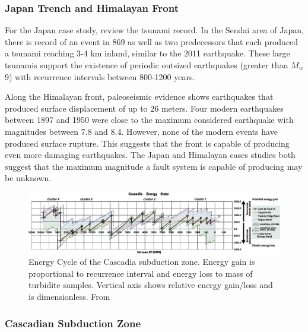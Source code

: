 \documentclass[]{proposalnsf}
\begin{document}
\subsubsection{Japan Trench and Himalayan Front}

For the Japan case study, \citet{Goldfinger2013} review the tsunami record. In the Sendai area of Japan, there is record of an event in 869 as well as two predecessors that each produced a tsunami reaching 3-4 km inland, similar to the 2011 earthquake. These large tsunamis support the existence of periodic outsized earthquakes (greater than $M_w$ 9) with recurrence intervals between 800-1200 years. 

Along the Himalayan front, paleoseismic evidence shows earthquakes that produced surface displacement of up to 26 meters.  Four modern earthquakes between 1897 and 1950 were close to the maximum considered earthquake with magnitudes between 7.8 and 8.4. However, none of the modern events have produced surface rupture. This suggests that the front is capable of producing even more damaging earthquakes. The Japan and Himalayan cases studies both suggest that the maximum magnitude a fault system is capable of producing may be unknown. 

\begin{figure}
	\includegraphics[width=1\linewidth]{./Figures/Goldfinger/F4large.jpg}
	\caption{Energy Cycle of the Cascadia subduction zone. Energy gain is proportional to recurrence interval and energy loss to mass of turbidite samples. Vertical axis shows relative energy gain/loss and is dimensionless. From \citet{Goldfinger2013}}
	\label{fig:energyCycle}
\end{figure}

\subsubsection{Cascadian Subduction Zone}
\end{document}
